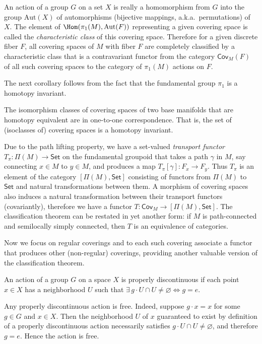 \begin{rem}
    An action of a group $G$ on a set $X$ is really a homomorphism from $G$ into the group $\mathrm{Aut}(X)$ of automorphisms (bijective mappings, a.k.a.~permutations) of $X$. The element of $\Hom(\pi_1(M),\mathrm{Aut}(F))$ representing a given covering space is called the \emph{characteristic class} of this covering space. Therefore for a given discrete fiber $F$, all covering spaces of $M$ with fiber $F$ are completely classified by a characteristic class that is a contravariant functor from the category $\mathsf{Cov}_M(F)$ of all such covering spaces to the category of $\pi_1(M)$ actions on $F$.
\end{rem}

The next corollary follows from the fact that the fundamental group $\pi_1$ is a homotopy invariant.
\begin{cor}
    The isomorphism classes of covering spaces of two base manifolds that are homotopy equivalent are in one-to-one correspondence. That is, the set of (isoclasses of) covering spaces is a homotopy invariant. 
\end{cor}


\begin{rem}
    Due to the path lifting property, we have a set-valued \emph{transport functor} $T_\pi:\Pi(M)\to \mathsf{Set}$ on the fundamental groupoid that takes a path $\gamma$ in $M$, say connecting $x\in M$ to $y\in M$, and produces a map $T_\pi[\gamma]:F_x\to F_y$. Thus $T_\pi$ is an element of the category $[\Pi(M),\mathsf{Set}]$ consisting of functors from $\Pi(M)$ to $\mathsf{Set}$ and natural transformations between them. A morphism of covering spaces also induces a natural transformation between their transport functors (covariantly), therefore we have a functor $T:\mathsf{Cov}_M\to [\Pi(M),\mathsf{Set}]$. The classification theorem can be restated in yet another form: if $M$ is path-connected and semilocally simply connected, then $T$ is an equivalence of categories.
\end{rem}


Now we focus on regular coverings and to each such covering associate a functor that produces other (non-regular) coverings, providing another valuable version of the classification theorem. 

\begin{defn}
    An action of a group $G$ on a space $X$ is properly discontinuous if each point $x\in X$ has a neighborhood $U$ such that $\exists\, g\cdot U\cap U\neq \varnothing \Leftrightarrow g=e$.
\end{defn}
\begin{rem}
    Any properly discontinuous action is free. Indeed, suppose $g\cdot x=x$ for some $g\in G$ and $x\in X$. Then the neighborhood $U$ of $x$ guaranteed to exist by definition of a properly discontinuous action necessarily satisfies $g\cdot U\cap U\neq\varnothing$, and therefore $g=e$. Hence the action is free.
\end{rem}

